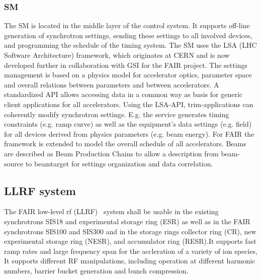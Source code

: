 \subsubsection{SM}
The \gls{SM} is located in the middle layer of the control system. It supports off-line generation of synchrotron settings, sending these settings to all involved devices,
and programming the schedule of the timing system. The SM uses the LSA (LHC Software Architecture) framework, which originates at CERN and is now developed further in collaboration with GSI for the FAIR project. The settings management is based on a physics model for accelerator optics, parameter space and overall relations between parameters and between accelerators. A standardized API allows accessing data in a common way as basis for generic client applications for all accelerators. Using the LSA-API, trim-applications can coherently modify synchrotron settings. E.g. the service generates timing constraints (e.g. ramp curve) as well as the equipment’s data settings (e.g. field) for all devices derived from physics parameters (e.g. beam energy). For FAIR the framework is extended to model the overall schedule of all accelerators. Beams are described as Beam Production
Chains to allow a description from beam-source to beamtarget for settings organization and data correlation.

\subsection{LLRF system}
The FAIR low-level rf (\gls{LLRF})~\cite{klingbeil_new_2011} system shall be usable in the existing synchrotrons SIS18 and experimental storage ring (\gls{ESR}) as well as in the FAIR synchrotrons SIS100 and SIS300 and in the storage rings collector ring (\gls{CR}), new experimental storage ring (\gls{NESR}), and accumulator ring (\gls{RESR}).It supports fast ramp rates and large frequency span for the accleration of a variety of ion species, It supports different RF manipulations, including operation at different harmonic numbers, barrier bucket generation and bunch compression. 

